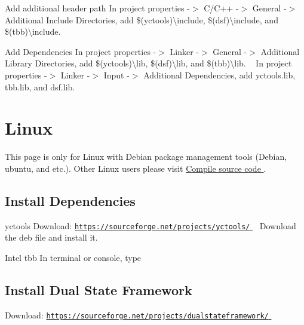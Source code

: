 \begin{DoxyParagraph}{Add additional header path}
In project properties -\/$>$ C/\+C++ -\/$>$ General -\/$>$ Additional Include Directories, add \$(yctools)\textbackslash{}include, \$(dsf)\textbackslash{}include, and \$(tbb)\textbackslash{}include.
\end{DoxyParagraph}
\begin{DoxyParagraph}{Add Dependencies}
In project properties -\/$>$ Linker -\/$>$ General -\/$>$ Additional Library Directories, add \$(yctools)\textbackslash{}lib, \$(dsf)\textbackslash{}lib, and \$(tbb)\textbackslash{}lib. ~\newline
 In project properties -\/$>$ Linker -\/$>$ Input -\/$>$ Additional Dependencies, add yctools.\+lib, tbb.\+lib, and dsf.\+lib.
\end{DoxyParagraph}
\hypertarget{_installation_Linux}{}\section{Linux}\label{_installation_Linux}
This page is only for Linux with Debian package management tools (Debian, ubuntu, and etc.). Other Linux users please visit \hyperlink{_installation_source}{Compile source code }. \hypertarget{_installation_dependencies_linux}{}\subsection{Install Dependencies}\label{_installation_dependencies_linux}
\begin{DoxyParagraph}{yctools}
Download\+: \hyperlink{}{\href{https://sourceforge.net/projects/yctools/}{\tt https\+://sourceforge.\+net/projects/yctools/} } ~\newline
 Download the deb file and install it.
\end{DoxyParagraph}
\begin{DoxyParagraph}{Intel tbb}
In terminal or console, type 

\end{DoxyParagraph}
\hypertarget{_installation_dsf_linux}{}\subsection{Install Dual State Framework}\label{_installation_dsf_linux}
Download\+: \hyperlink{}{\href{https://sourceforge.net/projects/dualstateframework/}{\tt https\+://sourceforge.\+net/projects/dualstateframework/} } ~\newline

